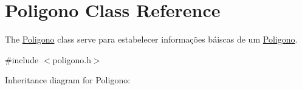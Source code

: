 \hypertarget{classPoligono}{}\section{Poligono Class Reference}
\label{classPoligono}


The \hyperlink{classPoligono}{Poligono} class serve para estabelecer informações báiscas de um \hyperlink{classPoligono}{Poligono}.  




{\ttfamily \#include $<$poligono.\+h$>$}



Inheritance diagram for Poligono\+:
